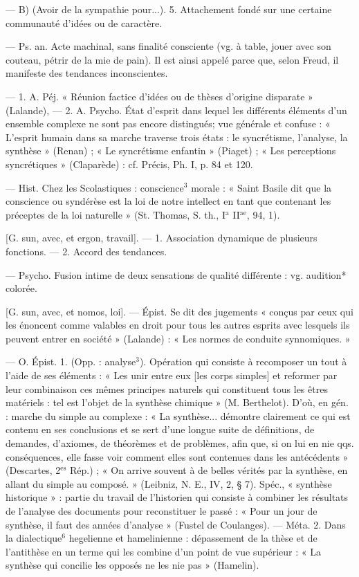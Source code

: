 \begin{itemize}[leftmargin=1cm, label=, itemsep=1pt]
— B) (Avoir de la sympathie
pour...). 5. Attachement fondé sur
une certaine communauté d'idées
ou de caractère.

 — Ps. an.
Acte machinal, sans finalité consciente (vg. à table, jouer avec son
couteau, pétrir de la mie de pain).
Il est ainsi appelé parce que, selon
Freud, il manifeste des tendances
inconscientes.

 — 1. A. Péj. « Réunion
factice d’idées ou de thèses d’origine
disparate » (Lalande), — 2. A.
Psycho. État d’esprit dans lequel
les différents éléments d’un ensemble complexe ne sont pas encore
distingués; vue générale et confuse :
« L’esprit humain dans sa marche
traverse trois états : le syncrétisme,
l'analyse, la synthèse » (Renan) ;
« Le syncrétisme enfantin » (Piaget) ;
« Les perceptions syncrétiques »
(Claparède) : cf. Précis, Ph. I, p. 84
et 120.

 — Hist. Chez les Scolastiques : conscience$^3$ morale : « Saint
Basile dit que la conscience ou syndérèse est la loi de notre intellect en
tant que contenant les préceptes de
la loi naturelle » (St. Thomas, S. th.,
I$^\text{a}$ II$^\text{ae}$, 94, 1).

 [G. sun, avec, et ergon, travail]. — 1. Association dynamique
de plusieurs fonctions. — 2. Accord
des tendances.

 — Psycho. Fusion intime
de deux sensations de qualité différente : vg. audition* colorée.

 [G. sun, avec, et nomos,
loi]. — Épist. Se dit des jugements
« conçus par ceux qui les énoncent
comme valables en droit pour tous
les autres esprits avec lesquels ils
peuvent entrer en société » (Lalande) : « Les normes de conduite
synnomiques. »

 — O. Épist. 1. (Opp. : analyse$^3$). Opération qui consiste à recomposer un tout à l’aide de ses
éléments : « Les unir entre eux [les
corps simples] et reformer par leur
combinaison ces mêmes principes
naturels qui constituent tous les
êtres matériels : tel est l’objet de la
synthèse chimique » (M. Berthelot).
D'où, en gén. : marche du simple au
complexe : « La synthèse... démontre
clairement ce qui est contenu en ses
conclusions et se sert d’une longue
suite de définitions, de demandes,
d’axiomes, de théorèmes et de
problèmes, afin que, si on lui en
nie qqs. conséquences, elle fasse
voir comment elles sont contenues
dans les antécédents » (Descartes,
2$^\text{es}$ Rép.) ; « On arrive souvent à de
belles vérités par la synthèse, en
allant du simple au composé. »
(Leibniz, N. E., IV, 2, § 7). Spéc.,
« synthèse historique » : partie du
travail de l’historien qui consiste à
combiner les résultats de l’analyse
des documents pour reconstituer le
passé : « Pour un jour de synthèse,
il faut des années d'analyse » (Fustel
de Coulanges). — Méta. 2. Dans la
dialectique$^6$ hegelienne et hamelinienne : dépassement de la thèse et
de l’antithèse en un terme qui les
combine d’un point de vue supérieur : « La synthèse qui concilie les
opposés ne les nie pas » (Hamelin).


\end{itemize}
